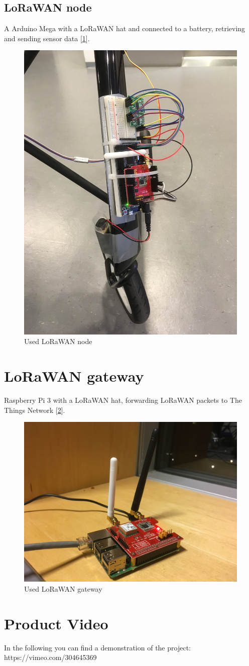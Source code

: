 \subsection{LoRaWAN node}
A Arduino Mega with a LoRaWAN hat and connected to a battery, retrieving and sending sensor data [\ref{fig:walkerpictures_node}].
\begin{figure}[h!]
	\centering
	\includegraphics[width=0.7\linewidth]{gfx/walkerpictures/node}
	\caption{Used LoRaWAN node}
	\label{fig:walkerpictures_node}
\end{figure}
\newpage

\section{LoRaWAN gateway}
Raspberry Pi 3 with a LoRaWAN hat, forwarding LoRaWAN packets to The Things Network [\ref{fig:walkerpictures_gateway}].
\begin{figure}[h!]
	\centering
	\includegraphics[width=0.7\linewidth]{gfx/walkerpictures/gateway}
	\caption{Used LoRaWAN gateway}
	\label{fig:walkerpictures_gateway}
\end{figure}

\section{Product Video}
In the following you can find a demonstration of the project:\\
https://vimeo.com/304645369

